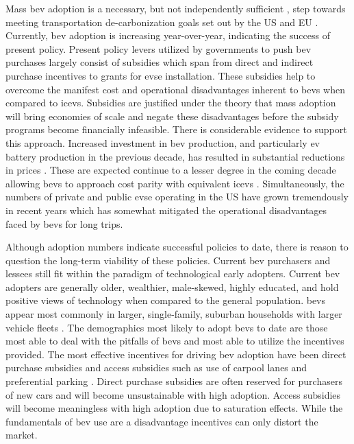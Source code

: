 \documentclass[letterpaper]{sae}
\begin{document}
Mass \gls{bev} adoption is a necessary, but not independently sufficient \cite{Iaconangelo_2020,Milovanoff_2020}, step towards meeting transportation de-carbonization goals set out by the US and EU \cite{whitehouse_2021,european_commission_2020}. Currently, \gls{bev} adoption is increasing year-over-year, indicating the success of present policy. Present policy levers utilized by governments to push \gls{bev} purchases largely consist of subsidies which span from direct and indirect purchase incentives to grants for \gls{evse} installation. These subsidies help to overcome the manifest cost and operational disadvantages inherent to \glspl{bev} when compared to \glspl{icev}. Subsidies are justified under the theory that mass adoption will bring economies of scale and negate these disadvantages before the subsidy programs become financially infeasible. There is considerable evidence to support this approach. Increased investment in \gls{bev} production, and particularly \gls{ev} battery production in the previous decade, has resulted in substantial reductions in prices \cite{Sakti_2017}. These are expected continue to a lesser degree in the coming decade \cite{Hsieh_2019} allowing \glspl{bev} to approach cost parity with equivalent \glspl{icev} \cite{Burnham_2021}. Simultaneously, the numbers of private and public \gls{evse} operating in the US have grown tremendously in recent years \cite{AFDC_EVSE_2023} which has somewhat mitigated the operational disadvantages faced by \glspl{bev} for long trips.

Although adoption numbers indicate successful policies to date, there is reason to question the long-term viability of these policies. Current \gls{bev} purchasers and lessees still fit within the paradigm of technological early adopters. Current \gls{bev} adopters are generally older, wealthier, male-skewed, highly educated, and hold positive views of technology \cite{Axsen_2016,Long_2022,Lane_2018,Taherdoost_2018,Straub_2009} when compared to the general population. \glspl{bev} appear most commonly in larger, single-family, suburban households with larger vehicle fleets \cite{MacArthur_2018,ICCT_2022,Fevang_2021,Chakraborty_2022}. The demographics most likely to adopt \glspl{bev} to date are those most able to deal with the pitfalls of \glspl{bev} and most able to utilize the incentives provided. The most effective incentives for driving \gls{bev} adoption have been direct purchase subsidies \cite{Wang_2017,Hardman_2017,Johnson_2017,Roberson_2022,Bjerkan_2016,Diamond_2009} and access subsidies such as use of carpool lanes and preferential parking \cite{Hardman_2019,Chakraborty_2020,Huang_2018,Liu_2021}. Direct purchase subsidies are often reserved for purchasers of new cars and will become unsustainable with high adoption. Access subsidies will become meaningless with high adoption due to saturation effects. While the fundamentals of \gls{bev} use are a disadvantage incentives can only distort the market.
\end{document}
